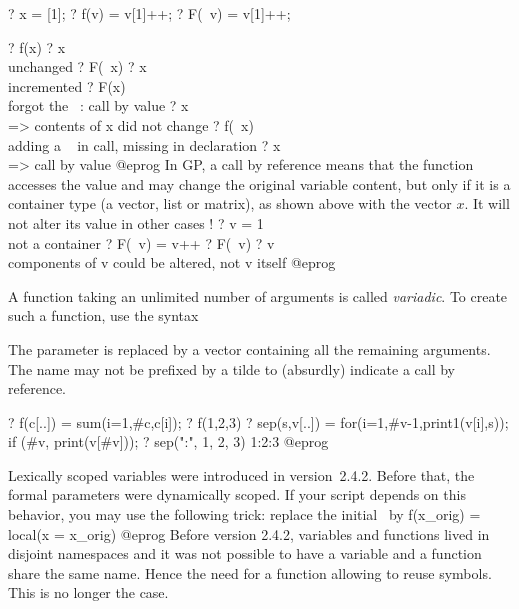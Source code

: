 \bprog
  ? x = [1];
  ? f(v)  = v[1]++;
  ? F(~v) = v[1]++;

  ? f(x)
  ? x      \\ unchanged
  ? F(~x)
  ? x      \\ incremented
  ? F(x)   \\ forgot the ~: call by value
  ? x      \\ => contents of x did not change
  ? f(~x)  \\ adding a ~ in call, missing in declaration
  ? x      \\ => call by value
@eprog
 In GP, a call by reference means that the function
accesses the value and may change the original variable content, but only if
it is a container type (a vector, list or matrix), as shown above with the
vector $x$. It will not alter its value in other cases !
\bprog
  ? v = 1  \\ not a container
  ? F(~v) = v++
  ? F(~v)
  ? v \\ components of v could be altered, not v itself
@eprog


A function taking an unlimited number of arguments is called \emph{variadic}.
To create such a function, use the syntax


\noindent The parameter  is replaced by a vector containing all the
remaining arguments. The name may not be prefixed by a tilde to (absurdly)
indicate a call by reference.

\bprog
? f(c[..]) = sum(i=1,#c,c[i]);
? f(1,2,3)
? sep(s,v[..]) = for(i=1,#v-1,print1(v[i],s)); if (#v, print(v[#v]));
? sep(":", 1, 2, 3)
1:2:3
@eprog

 Lexically scoped
variables were introduced in version~2.4.2. Before that, the formal
parameters were dynamically scoped. If your script depends on this behavior,
you may use the following trick: replace the initial  \ by
\bprog
f(x_orig) = local(x = x_orig)
@eprog
 Before version
2.4.2, variables and functions lived in disjoint namespaces and it was not
possible to have a variable and a function share the same name. Hence the
need for a  function allowing to reuse symbols. This is no longer
the case.

